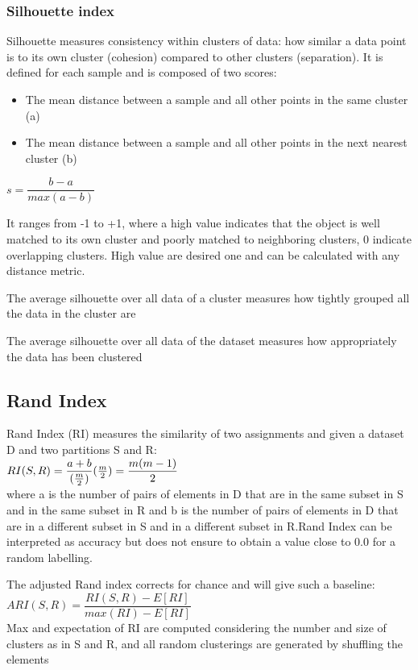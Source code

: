 \subsubsection{Silhouette index}
 Silhouette measures consistency within clusters of data: how similar a data point is to its own cluster (cohesion) compared to other clusters (separation). It is defined for each sample and is composed of two scores:
 \begin{itemize}
     \item The mean distance between a sample and all other points in the same cluster (a)
     \item The mean distance between a sample and all other points in the next nearest cluster (b)
 \end{itemize}
 \begin{center}
     $s= \dfrac{b-a}{max(a-b)}$
 \end{center}

It ranges from -1 to +1, where a high value indicates that the object is well matched to its own cluster and poorly matched to neighboring clusters, 0 indicate overlapping clusters.
High value are desired one and can be calculated with any distance metric.

The average silhouette over all data of a cluster measures how tightly grouped all the data in the cluster are

The average silhouette over all data of the dataset measures how appropriately the data has been clustered

\subsection{Rand Index}
Rand Index (RI) measures the similarity of two assignments and given a dataset D and two partitions S and R:\\
$RI(S,R) = \dfrac{a+b}{(\frac{m}{2})} \space (\frac{m}{2}) = \dfrac{m(m-1)}{2}$\\
where  a is the number of pairs of elements in D that are in the same subset in S and in the same subset in R and b is the number of pairs of elements in D that are in a different subset in S and in a different subset in R.Rand Index can be interpreted as accuracy but does not ensure to obtain a value close to 0.0 for a random labelling.

The adjusted Rand index corrects for chance and will give such a baseline:\\
$ ARI(S,R)= \dfrac{RI(S,R) - E [ RI ]}{max(RI) - E[RI]} $ \\
Max and expectation of RI are computed considering the number and size of clusters as in S and R, and all random clusterings are generated by shuffling the elements